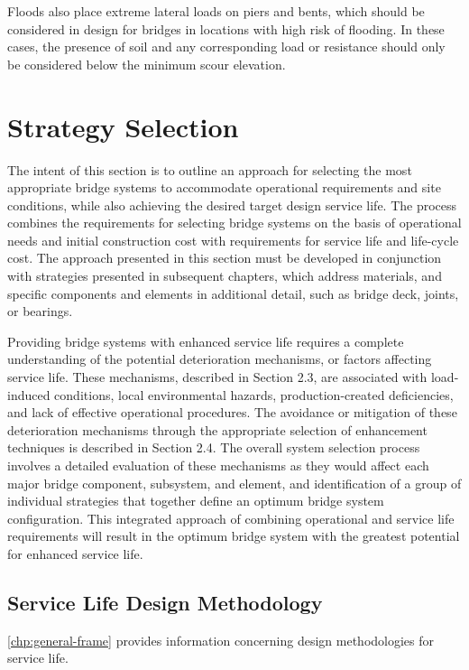 Floods also place extreme lateral loads on piers and bents, which should be considered in design for bridges in locations with high risk of flooding. In these cases, the presence of soil and any corresponding load or resistance
should only be considered below the minimum scour elevation.

\section{Strategy Selection}
\label{sec:strategy-selection}

The intent of this section is to outline an approach for selecting the most appropriate bridge systems to accommodate operational requirements and site conditions, while also achieving the desired target design service life. The process combines the requirements for selecting bridge systems on the basis of operational needs and initial construction cost with requirements for service life and life-cycle cost. The approach presented in this section must be developed in conjunction with strategies presented in subsequent chapters, which address materials, and specific components and elements in additional detail, such as bridge deck, joints, or bearings.

Providing bridge systems with enhanced service life requires a complete understanding of the potential deterioration mechanisms, or factors affecting service life. These mechanisms, described in Section 2.3, are associated with load-induced conditions, local environmental hazards, production-created deficiencies, and lack of effective operational procedures. The avoidance or mitigation of these deterioration mechanisms through the appropriate selection of enhancement techniques is described in Section 2.4. The overall system selection process involves a detailed evaluation of these mechanisms as they would affect each major bridge component, subsystem, and element, and identification of a group of individual strategies that together define an optimum bridge system configuration. This integrated approach of combining operational and service life requirements will result in the optimum bridge system with the greatest potential for enhanced service life.

\subsection{Service Life Design Methodology}

\cref{chp:general-frame} provides information concerning design methodologies for service life.


